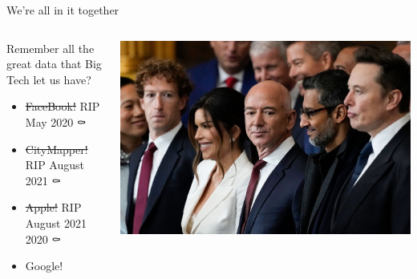 \documentclass[
  ignorenonframetext,
]{beamer}
\providecommand{\tightlist}{%
  \setlength{\itemsep}{0pt}\setlength{\parskip}{0pt}}\usepackage{longtable,booktabs,array}
\begin{document}
\begin{frame}{We're all in it together}
\label{were-all-in-it-together-2}
\begin{columns}[T]
\begin{column}{0.4\textwidth}
Remember all the great data that Big Tech let us have?

\begin{itemize}
\tightlist
\item
  \st{FaceBook!} RIP May 2020 ⚰️
\item
  \st{CityMapper!} RIP August 2021 ⚰️
\item
  \st{Apple!} RIP August 2021 2020 ⚰️
\item
  Google!
\end{itemize}
\end{column}

\begin{column}{0.6\textwidth}
\includegraphics{images/tech_knobs.jpeg}
\end{column}
\end{columns}
\end{frame}
\end{document}
